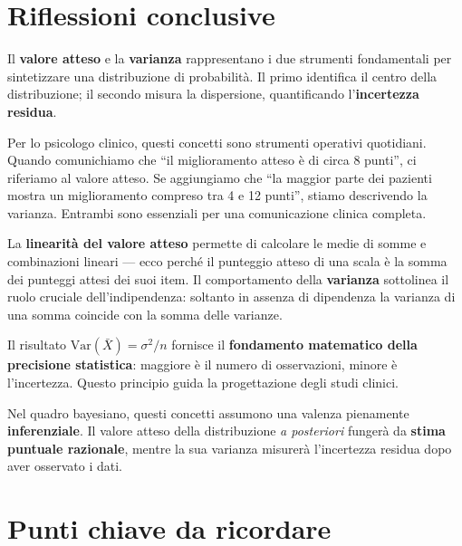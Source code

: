 \documentclass[
  italian,
  letterpaper,
  a4paper,
  11pt,
  open=any]{scrbook}
\theoremstyle{plain}
\theoremstyle{definition}
\theoremstyle{definition}
\theoremstyle{remark}
\begin{document}
\section*{Riflessioni conclusive}\label{riflessioni-conclusive-7}


Il \textbf{valore atteso} e la \textbf{varianza} rappresentano i due
strumenti fondamentali per sintetizzare una distribuzione di
probabilità. Il primo identifica il centro della distribuzione; il
secondo misura la dispersione, quantificando l'\textbf{incertezza
residua}.

Per lo psicologo clinico, questi concetti sono strumenti operativi
quotidiani. Quando comunichiamo che ``il miglioramento atteso è di circa
8 punti'', ci riferiamo al valore atteso. Se aggiungiamo che ``la
maggior parte dei pazienti mostra un miglioramento compreso tra 4 e 12
punti'', stiamo descrivendo la varianza. Entrambi sono essenziali per
una comunicazione clinica completa.

La \textbf{linearità del valore atteso} permette di calcolare le medie
di somme e combinazioni lineari --- ecco perché il punteggio atteso di
una scala è la somma dei punteggi attesi dei suoi item. Il comportamento
della \textbf{varianza} sottolinea il ruolo cruciale dell'indipendenza:
soltanto in assenza di dipendenza la varianza di una somma coincide con
la somma delle varianze.

Il risultato \(\text{Var}(\bar{X}) = \sigma^2/n\) fornisce il
\textbf{fondamento matematico della precisione statistica}: maggiore è
il numero di osservazioni, minore è l'incertezza. Questo principio guida
la progettazione degli studi clinici.

Nel quadro bayesiano, questi concetti assumono una valenza pienamente
\textbf{inferenziale}. Il valore atteso della distribuzione \emph{a
posteriori} fungerà da \textbf{stima puntuale razionale}, mentre la sua
varianza misurerà l'incertezza residua dopo aver osservato i dati.

\section*{Punti chiave da ricordare}\label{punti-chiave-da-ricordare-7}

\end{document}
